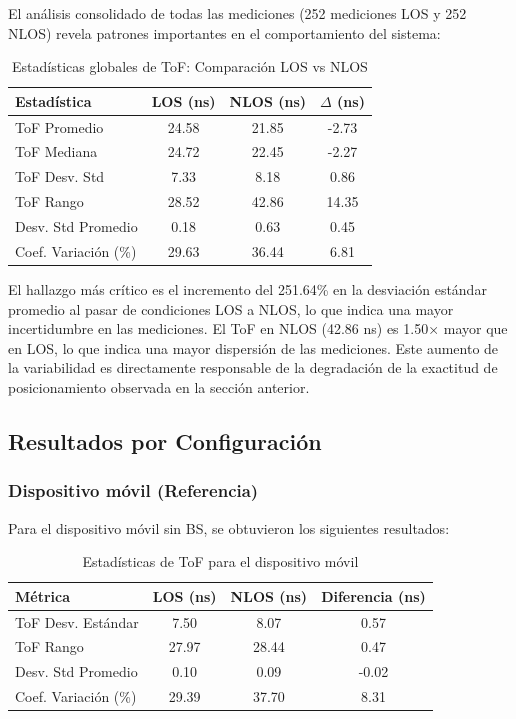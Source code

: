 El análisis consolidado de todas las mediciones (252 mediciones LOS y 252 NLOS) revela patrones importantes en el comportamiento del sistema:
%
\begin{table}[hbt]
\centering
\caption{Estadísticas globales de ToF: Comparación LOS vs NLOS}
\label{tab:tof_global}
\begin{tabular}{lccc}
\hline
\rowcolor{headerblue}
\textbf{Estadística} & \textbf{LOS (ns)} & \textbf{NLOS (ns)} & \textbf{$\Delta$ (ns)} \\
\hline
ToF Promedio & 24.58 & 21.85 & -2.73 \\
ToF Mediana & 24.72 & 22.45 & -2.27 \\
ToF Desv. Std & 7.33 & 8.18 & 0.86 \\
ToF Rango & 28.52 & 42.86 & 14.35 \\
Desv. Std Promedio & 0.18 & 0.63 & 0.45 \\
Coef. Variación (\%) & 29.63 & 36.44 & 6.81 \\
\hline
\end{tabular}
\end{table}

El hallazgo más crítico es el incremento del 251.64\% en la desviación estándar promedio al pasar de condiciones LOS a NLOS, lo que indica una mayor incertidumbre en las mediciones. El  ToF en NLOS (42.86 ns) es 1.50× mayor que en LOS, lo que indica una mayor dispersión de las mediciones. Este aumento de la variabilidad es directamente responsable de la degradación de la exactitud de posicionamiento observada en la sección anterior.

\subsection{Resultados por Configuración}

\subsubsection{Dispositivo móvil (Referencia)}

Para el dispositivo móvil sin BS, se obtuvieron los siguientes resultados:

\begin{table}[hbt]
\centering
\caption{Estadísticas de ToF para el dispositivo móvil}
\label{tab:tof_tag}
\begin{tabular}{lccc}
\hline
\rowcolor{headerblue}
\textbf{Métrica} & \textbf{LOS (ns)} & \textbf{NLOS (ns)} & \textbf{Diferencia (ns)} \\
\hline
ToF Desv. Estándar & 7.50 & 8.07 & 0.57 \\
ToF Rango & 27.97 & 28.44 & 0.47 \\
Desv. Std Promedio & 0.10 & 0.09 & -0.02 \\
Coef. Variación (\%) & 29.39 & 37.70 & 8.31 \\
\hline
\end{tabular}
\end{table}

